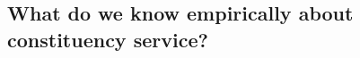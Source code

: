 \documentclass{article}
\begin{document}














\subsection{What do we know empirically about constituency service?}
\end{document}

